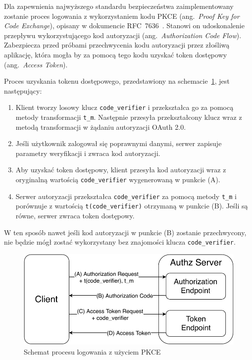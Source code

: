 	Dla zapewnienia najwyższego standardu bezpieczeństwa zaimplementowany zostanie proces logowania z wykorzystaniem kodu PKCE (ang.\ \emph{Proof Key for Code Exchange}),
	opisany w dokumencie RFC~7636~\cite{PKCE}.
	Stanowi on udoskonalenie przepływu wykorzystującego kod autoryzacji (ang.\ \emph{Authorization Code Flow}).
	Zabezpiecza przed próbami przechwycenia kodu autoryzacji przez złośliwą aplikację,
	która mogła by za pomocą tego kodu uzyskać token dostępowy (ang.\ \emph{Access Token}).
	
	Proces uzyskania tokenu dostępowego, przedstawiony na schemacie~\ref{fig:pkce}, jest następujący:
	\begin{enumerate}[label=\Alph*.]
		\item Klient tworzy losowy klucz \verb|code_verifier| i przekształca go za pomocą metody transformacji \verb|t_m|.
			Następnie przesyła przekształcony klucz wraz z metodą transformacji w żądaniu autoryzacji OAuth 2.0.
		\item Jeśli użytkownik zalogował się poprawnymi danymi, serwer zapisuje parametry weryfikacji i zwraca kod autoryzacji.
		\item Aby uzyskać token dostępowy, klient przesyła kod autoryzacji wraz z oryginalną wartością \verb|code_verifier| wygenerowaną w punkcie (A).
		\item Serwer autoryzacji przekształca \verb|code_verifier| za pomocą metody \verb|t_m|
			i porównuje z wartością \verb|t(code_verifier)| otrzymaną w punkcie (B).
			Jeśli są równe, serwer zwraca token dostępowy.
	\end{enumerate}

	W ten sposób nawet jeśli kod autoryzacji w punkcie (B) zostanie przechwycony,
	nie będzie mógł zostać wykorzystany bez znajomości klucza \verb|code_verifier|.

	\begin{figure}[ht]
		\centering
			\includegraphics[width=0.7\linewidth]{rys03/pkce.pdf}
		 \caption{Schemat procesu logowania z użyciem PKCE}
		 \label{fig:pkce}
	\end{figure}
